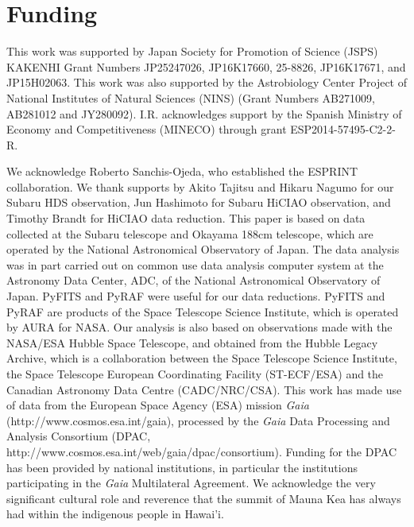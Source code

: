\documentclass[]{pasj01}
\begin{document}
\section{Funding}

This work was supported by Japan Society for Promotion of Science (JSPS)
KAKENHI Grant Numbers JP25247026, JP16K17660, 25-8826, JP16K17671, and JP15H02063.
This work was also supported by the Astrobiology Center Project of
National Institutes of Natural Sciences (NINS)
(Grant Numbers AB271009, AB281012 and JY280092).
I.R. acknowledges support by the Spanish Ministry of Economy
and Competitiveness (MINECO) through grant ESP2014-57495-C2-2-R.

\begin{ack}
We acknowledge Roberto Sanchis-Ojeda, who established the ESPRINT collaboration.
We thank supports by Akito Tajitsu and Hikaru Nagumo for our Subaru HDS observation,
Jun Hashimoto for Subaru HiCIAO observation, and Timothy Brandt for HiCIAO data reduction.
This paper is based on data collected at the Subaru telescope and Okayama 188cm telescope,
which are operated by the National Astronomical Observatory of Japan.  
The data analysis was in part carried out on common use data analysis computer system
at the Astronomy Data Center, ADC, of the National Astronomical Observatory of Japan.
PyFITS and PyRAF were useful for our data reductions.
PyFITS and PyRAF are products of the Space Telescope Science Institute, which is operated by AURA for NASA.  
Our analysis is also based on observations made with the NASA/ESA Hubble Space Telescope,
and obtained from the Hubble Legacy Archive, which is a collaboration between
the Space Telescope Science Institute, the Space Telescope European Coordinating Facility (ST-ECF/ESA)
and the Canadian Astronomy Data Centre (CADC/NRC/CSA).
This work has made use of data from the European Space Agency (ESA)
mission {\it Gaia} (http://www.cosmos.esa.int/gaia), processed by
the {\it Gaia} Data Processing and Analysis Consortium (DPAC,
http://www.cosmos.esa.int/web/gaia/dpac/consortium). Funding
for the DPAC has been provided by national institutions, in particular
the institutions participating in the {\it Gaia} Multilateral Agreement.
We acknowledge the very significant cultural role and reverence that the
summit of Mauna Kea has always had within the indigenous people in Hawai'i. 
\end{ack}
\end{document}
